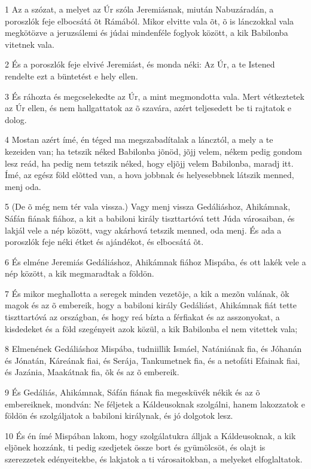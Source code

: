\par 1 Az a szózat, a melyet az Úr szóla Jeremiásnak, miután Nabuzáradán, a poroszlók feje elbocsátá õt Rámából. Mikor elvitte vala õt, õ is lánczokkal vala megkötözve a jeruzsálemi és júdai mindenféle foglyok között, a kik Babilonba vitetnek vala.
\par 2 És a poroszlók feje elvivé Jeremiást, és monda néki: Az Úr, a te Istened rendelte ezt a büntetést e hely ellen.
\par 3 És ráhozta és megcselekedte az Úr, a mint megmondotta vala. Mert vétkeztetek az Úr ellen, és nem hallgattatok az õ szavára, azért teljesedett be ti rajtatok e dolog.
\par 4 Mostan azért ímé, én téged ma megszabadítalak a láncztól, a mely a te kezeiden van; ha tetszik néked Babilonba jõnöd, jõjj velem, nékem pedig gondom lesz reád, ha pedig nem tetszik néked, hogy eljõjj velem Babilonba, maradj itt. Ímé, az egész föld elõtted van, a hova jobbnak és helyesebbnek látszik menned, menj oda.
\par 5 (De õ még nem tér vala vissza.) Vagy menj vissza Gedáliáshoz, Ahikámnak, Sáfán fiának fiához, a kit a babiloni király tiszttartóvá tett Júda városaiban, és lakjál vele a nép között, vagy akárhová tetszik menned, oda menj. És ada a poroszlók feje néki étket és ajándékot, és elbocsátá õt.
\par 6 És elméne Jeremiás Gedáliáshoz, Ahikámnak fiához Mispába, és ott lakék vele a nép között, a kik megmaradtak a földön.
\par 7 És mikor meghallotta a seregek minden vezetõje, a kik a mezõn valának, õk magok és az õ embereik, hogy a babiloni király Gedáliást, Ahikámnak fiát tette tiszttartóvá az országban, és hogy reá bízta a férfiakat és az asszonyokat, a kisdedeket és a föld szegényeit azok közül, a kik Babilonba el nem vitettek vala;
\par 8 Elmenének Gedáliáshoz Mispába, tudniillik Ismáel, Natániának fia, és Jóhanán és Jónatán, Káreának fiai, és Serája, Tankumetnek fia, és a netofáti Efainak fiai, és Jazánia, Maakátnak fia, õk és az õ embereik.
\par 9 És Gedáliás, Ahikámnak, Sáfán fiának fia megesküvék nékik és az õ embereiknek, mondván: Ne féljetek a Káldeusoknak szolgálni, hanem lakozzatok e földön és szolgáljatok a babiloni királynak, és jó dolgotok lesz.
\par 10 És én ímé Mispában lakom, hogy szolgálatukra álljak a Káldeusoknak, a kik eljõnek hozzánk, ti pedig szedjetek össze bort és gyümölcsöt, és olajt is szerezzetek edényeitekbe, és lakjatok a ti városaitokban, a melyeket elfoglaltatok.
